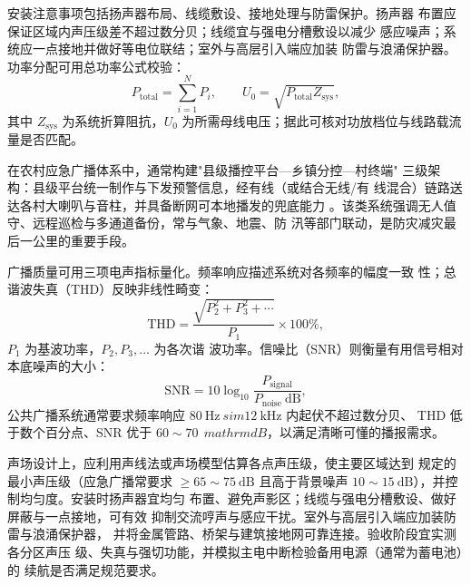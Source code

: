 安装注意事项包括扬声器布局、线缆敷设、接地处理与防雷保护。扬声器
布置应保证区域内声压级差不超过数分贝；线缆宜与强电分槽敷设以减少
感应噪声；系统应一点接地并做好等电位联结；室外与高层引入端应加装
防雷与浪涌保护器。功率分配可用总功率公式校验：
\begin{equation}
P_{\mathrm{total}} = \sum_{i=1}^{N} P_i, \qquad U_0 = \sqrt{P_{\mathrm{total}} Z_{\mathrm{sys}}},
\end{equation}
其中 $Z_{\mathrm{sys}}$ 为系统折算阻抗，$U
_0$ 为所需母线电压；据此可核对功放档位与线路载流量是否匹配。

在农村应急广播体系中，通常构建"县级播控平台—乡镇分控—村终端"
三级架构：县级平台统一制作与下发预警信息，经有线（或结合无线/有
线混合）链路送达各村大喇叭与音柱，并具备断网可本地播发的兜底能力
。该类系统强调无人值守、远程巡检与多通道备份，常与气象、地震、防
汛等部门联动，是防灾减灾最后一公里的重要手段。

广播质量可用三项电声指标量化。频率响应描述系统对各频率的幅度一致
性；总谐波失真（THD）反映非线性畸变：
\begin{equation}
\mathrm{THD} = \frac{\sqrt{P_2^2+P_3^2+\cdots}}{P_1}\times 100\%,
\end{equation}
$P_1$ 为基波功率，$P_2,P_3,\dots$ 为各次谐
波功率。信噪比（SNR）则衡量有用信号相对本底噪声的大小：
\begin{equation}
\mathrm{SNR} = 10\log_{10}\frac{P_{\mathrm{signal}}}{P_{\mathrm{noise}}\ \mathrm{dB}},
\end{equation}
公共广播系统通常要求频率响应 $80\ \mathrm{Hz}\
sim 12\ \mathrm{kHz}$ 内起伏不超过数分贝、
THD 低于数个百分点、SNR 优于 $60\sim 70\ \
mathrm{dB}$，以满足清晰可懂的播报需求。

声场设计上，应利用声线法或声场模型估算各点声压级，使主要区域达到
规定的最小声压级（应急广播常要求 $\ge 65\sim 75\
 \mathrm{dB}$ 且高于背景噪声 $10\sim 15
\ \mathrm{dB}$），并控制均匀度。安装时扬声器宜均匀
布置、避免声影区；线缆与强电分槽敷设、做好屏蔽与一点接地，可有效
抑制交流哼声与感应干扰。室外与高层引入端应加装防雷与浪涌保护器，
并将金属管路、桥架与建筑接地网可靠连接。验收阶段宜实测各分区声压
级、失真与强切功能，并模拟主电中断检验备用电源（通常为蓄电池）的
续航是否满足规范要求。
